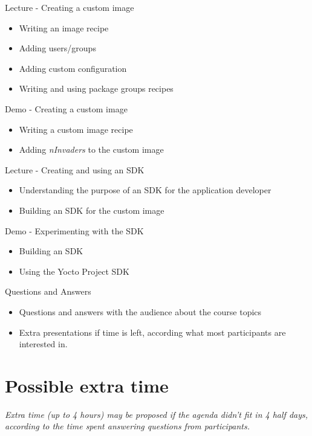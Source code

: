 \documentclass[a4paper,12pt,obeyspaces,spaces,hyphens]{article}
\begin{document}
\feagendatwocolumn
{Lecture - Creating a custom image}
{
  \begin{itemize}
  \item Writing an image recipe
  \item Adding users/groups
  \item Adding custom configuration
  \item Writing and using package groups recipes
  \end{itemize}
}
{Demo - Creating a custom image}
{
  \begin{itemize}
  \item Writing a custom image recipe
  \item Adding {\em nInvaders} to the custom image
  \end{itemize}
}
\feagendatwocolumn
{Lecture - Creating and using an SDK}
{
  \begin{itemize}
  \item Understanding the purpose of an SDK for the application
    developer
  \item Building an SDK for the custom image
  \end{itemize}
}
{Demo - Experimenting with the SDK}
{
  \begin{itemize}
  \item Building an SDK
  \item Using the Yocto Project SDK
  \end{itemize}
}

\feagendaonecolumn
{Questions and Answers}
{
  \begin{itemize}
  \item Questions and answers with the audience about the course topics
  \item Extra presentations if time is left, according what most
        participants are interested in.
  \end{itemize}
}

\section{Possible extra time}

{\em Extra time (up to 4 hours) may be proposed if the agenda didn't fit in 4 half days,
     according to the time spent answering questions from participants.}
\end{document}
